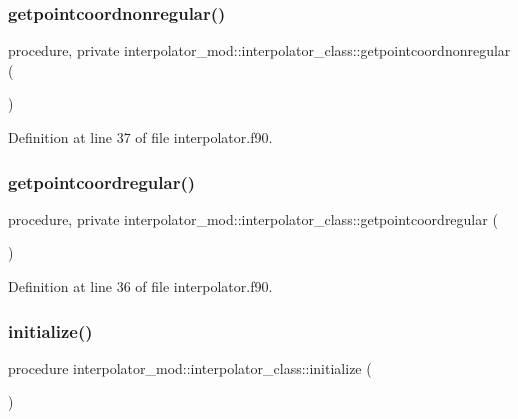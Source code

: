 \subsubsection{\texorpdfstring{getpointcoordnonregular()}{getpointcoordnonregular()}}
{\footnotesize\ttfamily procedure, private interpolator\+\_\+mod\+::interpolator\+\_\+class\+::getpointcoordnonregular (\begin{DoxyParamCaption}{ }\end{DoxyParamCaption})\hspace{0.3cm}{\ttfamily [private]}}



Definition at line 37 of file interpolator.\+f90.

\mbox{\label{structinterpolator__mod_1_1interpolator__class_a66fdc4b04c2bf6cb1304d379934e3830}} 
\subsubsection{\texorpdfstring{getpointcoordregular()}{getpointcoordregular()}}
{\footnotesize\ttfamily procedure, private interpolator\+\_\+mod\+::interpolator\+\_\+class\+::getpointcoordregular (\begin{DoxyParamCaption}{ }\end{DoxyParamCaption})\hspace{0.3cm}{\ttfamily [private]}}



Definition at line 36 of file interpolator.\+f90.

\mbox{\label{structinterpolator__mod_1_1interpolator__class_a6911f5a4e2cbe3fcd8fbfce906429436}} 
\subsubsection{\texorpdfstring{initialize()}{initialize()}}
{\footnotesize\ttfamily procedure interpolator\+\_\+mod\+::interpolator\+\_\+class\+::initialize (\begin{DoxyParamCaption}{ }\end{DoxyParamCaption})\hspace{0.3cm}{\ttfamily [private]}}



